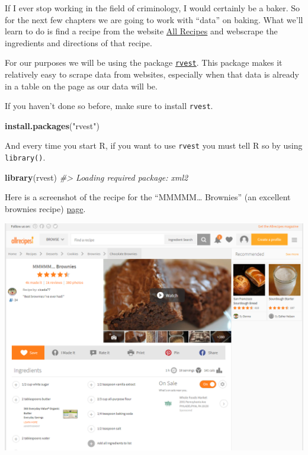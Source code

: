 \documentclass[
  12pt,
]{book}
\newenvironment{Shaded}{\begin{snugshade}}{\end{snugshade}}
\newcommand{\CommentTok}[1]{\textcolor[rgb]{0.37,0.37,0.37}{\textit{#1}}}
\newcommand{\KeywordTok}[1]{\textcolor[rgb]{0.27,0.27,0.27}{\textbf{#1}}}
\newcommand{\NormalTok}[1]{#1}
\newcommand{\StringTok}[1]{\textcolor[rgb]{0.5,0.5,0.5}{#1}}
\begin{document}
If I ever stop working in the field of criminology, I would certainly be a baker. So for the next few chapters we are going to work with ``data'' on baking. What we'll learn to do is find a recipe from the website \href{https://www.allrecipes.com/}{All Recipes} and webscrape the ingredients and directions of that recipe.

For our purposes we will be using the package \href{https://github.com/tidyverse/rvest}{\texttt{rvest}}. This package makes it relatively easy to scrape data from websites, especially when that data is already in a table on the page as our data will be.

If you haven't done so before, make sure to install \texttt{rvest}.

\begin{Shaded}
\begin{Highlighting}[]
\KeywordTok{install.packages}\NormalTok{(}\StringTok{"rvest"}\NormalTok{)}
\end{Highlighting}
\end{Shaded}

And every time you start R, if you want to use \texttt{rvest} you must tell R so by using \texttt{library()}.

\begin{Shaded}
\begin{Highlighting}[]
\KeywordTok{library}\NormalTok{(rvest)}
\CommentTok{\#> Loading required package: xml2}
\end{Highlighting}
\end{Shaded}

Here is a screenshot of the recipe for the ``MMMMM\ldots{} Brownies'' (an excellent brownies recipe) \href{https://www.allrecipes.com/recipe/25080/mmmmm-brownies/?internalSource=hub\%20recipe\&referringContentType=Search}{page}.

\includegraphics{images/brownies_1.PNG}
\end{document}
